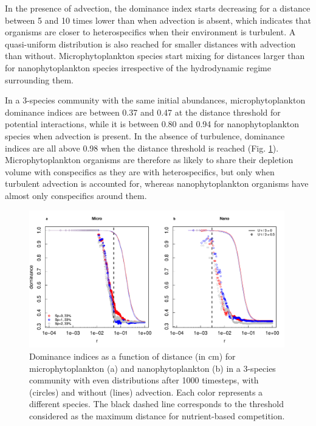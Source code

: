 \documentclass[english]{article}
\begin{document}
In the presence of advection, the dominance index starts decreasing
for a distance between 5 and 10 times lower than when advection is
absent, which indicates that organisms are closer to heterospecifics
when their environment is turbulent. A quasi-uniform distribution
is also reached for smaller distances with advection than without.
Microphytoplankton species start mixing for distances larger than
for nanophytoplankton species irrespective of the hydrodynamic regime
surrounding them.

In a 3-species community with the same initial abundances, microphytoplankton
dominance indices are between 0.37 and 0.47 at the distance threshold
for potential interactions, while it is between 0.80 and 0.94 for
nanophytoplankton species when advection is present. In the absence
of turbulence, dominance indices are all above 0.98 when the distance
threshold is reached (Fig. \ref{fig:Dominance-3sp}). Microphytoplankton
organisms are therefore as likely to share their depletion volume
with conspecifics as they are with heterospecifics, but only when
turbulent advection is accounted for, whereas nanophytoplankton organisms
have almost only conspecifics around them.

\begin{figure}[H]
\begin{centering}
\includegraphics[width=0.99\textwidth]{../code/figure/dominance_diatom_nano_compare_advection}
\par\end{centering}
\caption{Dominance indices as a function of distance (in cm) for microphytoplankton
(a) and nanophytoplankton (b) in a 3-species community with even distributions
after 1000 timesteps, with (circles) and without (lines) advection.
Each color represents a different species. The black dashed line corresponds
to the threshold considered as the maximum distance for nutrient-based
competition.\label{fig:Dominance-3sp} }
\end{figure}
\end{document}
